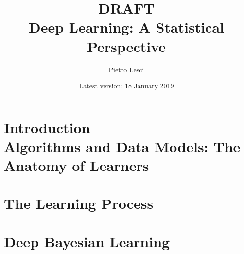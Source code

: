 \documentclass[12pt, oneside]{report}
\title{DRAFT\\Deep Learning: A Statistical Perspective}
\author{Pietro Lesci}
\date{Latest version: 18 January 2019}
\begin{document}
\maketitle






\tableofcontents
\listoffigures









\chapter[Introduction]{Introduction\\Algorithms and Data Models: The Anatomy of Learners}

\begin{center}
\end{center}




\chapter{The Learning Process}



\bigbreak
\begin{center}
\end{center}






\chapter[Deep Bayes Learning]{Deep Bayesian Learning}

\bigbreak
\begin{center}
\end{center}
\end{document}
